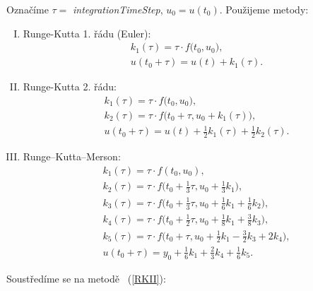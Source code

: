 \documentclass[11pt,american,czech]{article}
\begin{document}
\noindent
Označíme $\tau=$ \textit{integrationTimeStep}, $u_{0}=u(t_{0})$. Použijeme  metody:
\begin{enumerate}[I.]
	\item Runge-Kutta 1. řádu (Euler):
		\begin{equation*}
			\begin{split}
	&k_{1}(\tau)=\tau\cdot f\big(t_{0}, u_{0}\big), \\
	&u(t_0+\tau)=u(t) + k_{1}(\tau).
			\end{split}
		\end{equation*}
	\item Runge-Kutta 2. řádu: \label{RKII}
		\begin{equation*}
			\begin{split}
				&k_{1}(\tau)=\tau\cdot f\big(t_{0}, u_{0}\big), \\
				&k_{2}(\tau)=\tau\cdot f\big(t_{0}+\tau, u_{0}+k_{1}(\tau)\big), \\
				&u(t_0+\tau)=u(t) + \tfrac{1}{2}k_{1}(\tau)+\tfrac{1}{2}k_{2}(\tau).
			\end{split}
		\end{equation*}
	\item Runge–Kutta–Merson:
		\begin{equation*}
			\begin{split}
		&k_{1}(\tau) = \tau\cdot f(t_{0},u_{0}),\\
		&k_{2}(\tau) = \tau\cdot f \big( t_{0} + \tfrac13 \tau, u_{0} + \tfrac13 k_1 \big),\\
		&k_{3}(\tau) = \tau\cdot f \big( t_{0} + \tfrac13 \tau, u_{0} + \tfrac16 k_1 + \tfrac16 k_2 \big),\\
		&k_{4}(\tau) = \tau\cdot f \big( t_{0} + \tfrac12 \tau, u_{0} + \tfrac18 k_1 + \tfrac38 k_3 \big),\\
		&k_{5}(\tau) = \tau\cdot f \big( t_{0} + \tau, u_{0} + \tfrac12 k_1 - \tfrac32 k_3 + 2 k_4 \big),\\
		&u(t_{0}+\tau) = y_0 + \tfrac16 k_1 + \tfrac23 k_4 + \tfrac16 k_5.
			\end{split}
		\end{equation*}
\end{enumerate}

\noindent
Soustředíme se na metodě ~(\ref{RKII}):
\end{document}
